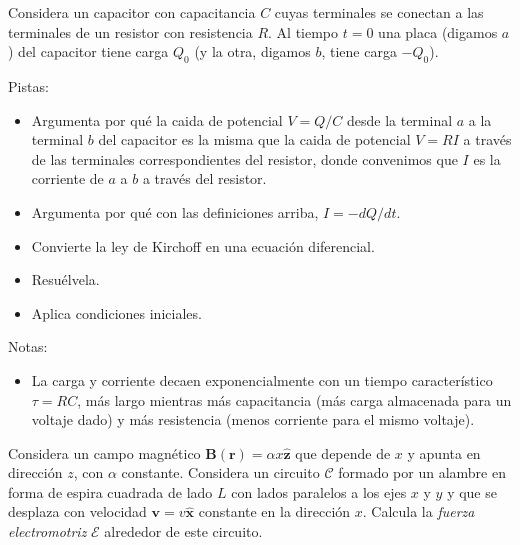\documentclass{exam}
\begin{document}
\begin{questions}
  \question Considera un capacitor con capacitancia $C$ cuyas
  terminales se conectan a las terminales de un resistor con resistencia $R$. Al
  tiempo $t=0$ una placa (digamos $a$) del capacitor tiene carga $Q_0$ (y la
  otra, digamos $b$, tiene carga $-Q_0$).

  Pistas:
  \begin{itemize}
  \item Argumenta por qué la caida de potencial $V=Q/C$ desde
    la terminal $a$ a la terminal $b$ del capacitor es la misma que la
    caida de potencial $V=RI$ a través de las terminales
    correspondientes del resistor, donde convenimos que $I$ es la
    corriente de $a$ a $b$ a través del resistor.
  \item Argumenta por qué con las definiciones arriba, $I=-dQ/dt$.
  \item Convierte la ley de Kirchoff en una ecuación diferencial.
  \item Resuélvela.
  \item Aplica condiciones iniciales.
  \end{itemize}
  Notas:
  \begin{itemize}
  \item La carga y corriente decaen exponencialmente con un tiempo
    característico $\tau=RC$, más largo mientras más capacitancia (más
    carga almacenada para un voltaje dado) y más resistencia (menos
    corriente para el mismo voltaje).
  \end{itemize}

  \question \label{l:a}Considera un campo magnético $\bm B(\bm r)=\alpha
  x\hat{\bm z}$ que depende de $x$ y apunta en dirección $z$, con
  $\alpha$ constante. Considera un circuito $\mathcal C$ formado
  por un alambre en forma de espira cuadrada de lado $L$ con lados
  paralelos a los ejes $x$ y $y$
  y que se desplaza con velocidad $\bm v=v\hat{\bm x}$ constante en la
  dirección $x$. Calcula la {\em fuerza electromotriz} $\mathcal E$
  alrededor de este circuito.


\end{questions}
\end{document}
